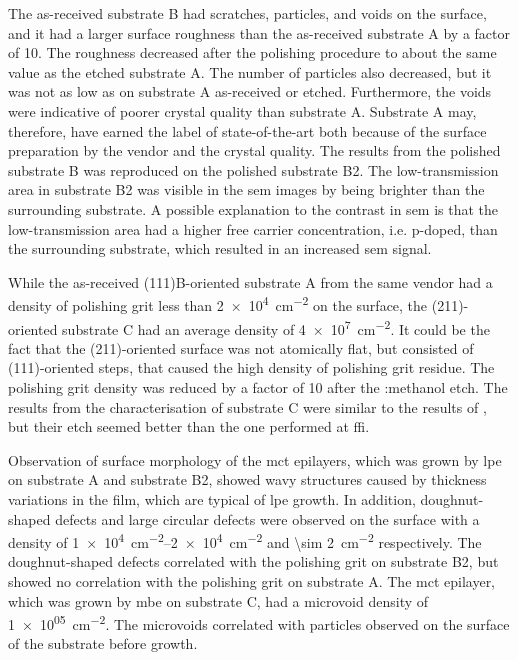 The as-received substrate B had scratches, particles, and voids on the surface, and it had a larger surface roughness than the as-received substrate A by a factor of 10. The roughness decreased after the polishing procedure to about the same value as the etched substrate A. The number of particles also decreased, but it was not as low as on substrate A as-received or etched. Furthermore, the voids were indicative of poorer crystal quality than substrate A. Substrate A may, therefore, have earned the label of state-of-the-art both because of the surface preparation by the vendor and the crystal quality. The results from the polished substrate B was reproduced on the polished substrate B2. The low-transmission area in substrate B2 was visible in the \ac{sem} images by being brighter than the surrounding substrate. A possible explanation to the contrast in \ac{sem} is that the low-transmission area had a higher free carrier concentration, i.e. p-doped, than the surrounding substrate, which resulted in an increased \ac{sem} signal.

While the as-received (111)B-oriented substrate A from the same vendor had a density of polishing grit less than \SI{2e4}{\centi\metre^{-2}} on the surface, the (211)-oriented substrate C had an average density of \SI{4e7}{\centi\metre^{-2}}. It could be the fact that the (211)-oriented surface was not atomically flat, but consisted of (111)-oriented steps, that caused the high density of polishing grit residue. The polishing grit density was reduced by a factor of 10 after the :methanol etch. The results from the characterisation of substrate C were similar to the results of \citeauthor{benson2016analysis}, but their etch seemed better than the one performed at \ac{ffi}.

Observation of surface morphology of the \ac{mct} epilayers, which was grown by \ac{lpe} on substrate A and substrate B2, showed wavy structures caused by thickness variations in the film, which are typical of \ac{lpe} growth. In addition, doughnut-shaped defects and large circular defects were observed on the surface with a density of \SIrange{1e4}{2e4}{\centi\metre^{-2}} and \SI{\sim 2}{\centi\metre^{-2}} respectively. The doughnut-shaped defects correlated with the polishing grit on substrate B2, but showed no correlation with the polishing grit on substrate A. The \ac{mct} epilayer, which was grown by \ac{mbe} on substrate C, had a microvoid density of \SI{1e+05}{\centi\metre^{-2}}. The microvoids correlated with particles observed on the surface of the substrate before growth.

